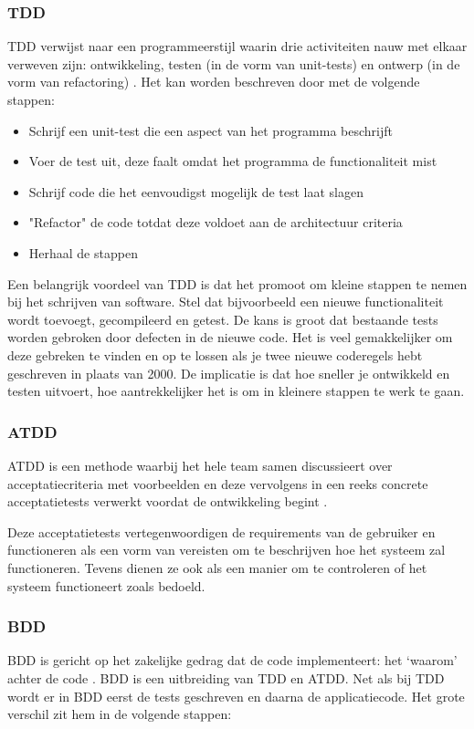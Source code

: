 \subsubsection{\acrfull{TDD}}
TDD verwijst naar een programmeerstijl waarin drie activiteiten nauw met elkaar verweven zijn: ontwikkeling, testen (in de vorm van unit-tests) en ontwerp (in de vorm van refactoring) \citep{janzen2005test}.
Het kan worden beschreven door met de volgende stappen:

\begin{itemize}[noitemsep]
    \item Schrijf een unit-test die een aspect van het programma beschrijft
    \item Voer de test uit, deze faalt omdat het programma de functionaliteit mist
    \item Schrijf code die het eenvoudigst mogelijk de test laat slagen
    \item "Refactor" de code totdat deze voldoet aan de architectuur criteria
    \item Herhaal de stappen
\end{itemize}

Een belangrijk voordeel van \acrshort{TDD} is dat het promoot om kleine stappen te nemen bij het schrijven van software. Stel dat bijvoorbeeld een nieuwe functionaliteit wordt toevoegt, gecompileerd en getest. De kans is groot dat bestaande tests worden gebroken door defecten in de nieuwe code. Het is veel gemakkelijker om deze gebreken te vinden en op te lossen als je twee nieuwe coderegels hebt geschreven in plaats van 2000. De implicatie is dat hoe sneller je ontwikkeld en testen uitvoert, hoe aantrekkelijker het is om in kleinere  stappen te werk te gaan.

\subsubsection{\acrfull{ATDD}}
\acrshort{ATDD} is een methode waarbij het hele team samen discussieert over acceptatiecriteria met voorbeelden en deze vervolgens in een reeks concrete acceptatietests verwerkt voordat de ontwikkeling begint \citep{aggarwal2014acceptance}.

Deze acceptatietests vertegenwoordigen de requirements van de gebruiker en functioneren als een vorm van vereisten om te beschrijven hoe het systeem zal functioneren. Tevens dienen ze ook als een manier om te controleren of het systeem functioneert zoals bedoeld. 

\subsubsection{\acrfull{BDD}}
\acrshort{BDD} is gericht op het zakelijke gedrag dat de code implementeert: het `waarom' achter de code \citep{wynne2017cucumber}. \acrshort{BDD} is een uitbreiding van \acrshort{TDD} en \acrshort{ATDD}. Net als bij \acrshort{TDD} wordt er in \acrshort{BDD} eerst de tests geschreven en daarna de applicatiecode. Het grote verschil zit hem in de volgende stappen:

